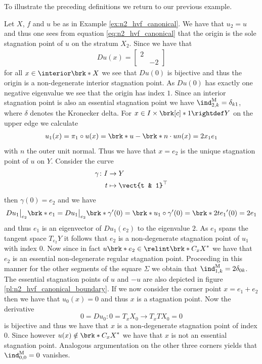To illustrate the preceding definitions we return to our previous example.
\begin{example}\label{ex:n2_hvf_index}
  Let $X$, $f$ and $u$ be as in Example \ref{ex:n2_hvf_canonical}.
  We have that $u_2=u$ and thus
  one sees from equation \eqref{eq:n2_hvf_canonical}
  that the origin is the sole stagnation point of $u$ on the stratum $X_2$. Since we have that
  \begin{align*}
    Du(x) = \begin{bmatrix}
      2 & \\
       & -2
    \end{bmatrix}
  \end{align*}
  for all $x\in\openX$ we see that $Du(0)$ is bijective and thus the origin is a non-degenerate interior stagnation point.
  As $Du(0)$ has
  exactly one negative eigenvalue we see that the origin has index $1$. 
  Since an interior stagnation point is also an essential stagnation point 
  we have $\ind^\text{M}_{2,k}=\delta_{k1}$, where $\delta$ denotes the Kronecker delta.
  For $x\in I\times\brk[c]*{1}\rightdef Y$ on the upper edge we calculate
  \begin{align*}
    u_1(x)=\pi_1\circ u(x)=\brk*{u-\brk*{n\cdot u}n}(x)
    =2x_1e_1
  \end{align*}
  with $n$ the outer unit normal.
  Thus we have that $x=e_2$ is the unique stagnation point of $u$ on $Y$.
  Consider the curve
  \begin{align*}
    \gamma\colon I&\to Y\\
    t&\mapsto \vect{t & 1}^\top
  \end{align*}
  then $\gamma(0)=e_2$ and we have
  \begin{align*}
    Du_1\big\vert_{e_2}\brk*{e_1}
    =Du_1\big\vert_{e_2}\brk*{\gamma'(0)}
    =\brk*{u_1\circ \gamma}'(0)
    =\brk*{2te_1}'(0)=2e_1
  \end{align*}
  and thus $e_1$ is an eigenvector of $Du_1(e_2)$ to the eigenvalue $2$. As $e_1$
  spans the tangent space $T_{e_2}Y$ it follows that $e_2$ is a non-degenerate stagnation point
  of $u_1$ with index $0$.
  Now since in fact $u\brk*{e_2}\in\relint\brk*{C_xX}^*$ we have that $e_2$ is an essential non-degenerate regular 
  stagnation point.
  Proceeding in this manner for the other segments of the square $\Sigma$ we obtain that
  $\ind^\text{M}_{1,k}=2\delta_{0k}$.
  The essential stagnation points of $u$ and $-u$ are also depicted in figure \ref{pl:n2_hvf_canonical_boundary}.
  If we now consider the corner point $x=e_1+e_2$ then we have that $u_0(x)=0$ and thus $x$ is a stagnation
  point.
  Now the derivative
  $$0=Du_0\colon 0=T_xX_0\to T_xTX_0=0$$
  is bijective and thus
  we have that $x$ is a non-degenerate stagnation point of
  index $0$. Since however $u(x)\notin \brk*{C_xX}^*$ we have that $x$ is not an essential stagnation point.
  Analogous argumentation on the other three corners yields that $\ind^\text{M}_{0,0}=0$ vanishes.
\end{example}


